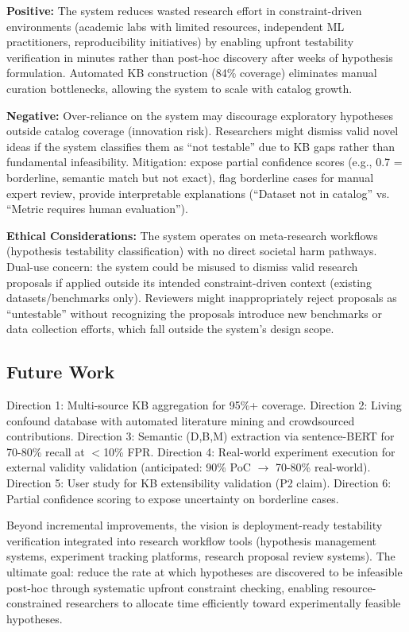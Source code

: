\textbf{Positive:} The system reduces wasted research effort in constraint-driven environments (academic labs with limited resources, independent ML practitioners, reproducibility initiatives) by enabling upfront testability verification in minutes rather than post-hoc discovery after weeks of hypothesis formulation. Automated KB construction (84\% coverage) eliminates manual curation bottlenecks, allowing the system to scale with catalog growth.

\textbf{Negative:} Over-reliance on the system may discourage exploratory hypotheses outside catalog coverage (innovation risk). Researchers might dismiss valid novel ideas if the system classifies them as ``not testable'' due to KB gaps rather than fundamental infeasibility. Mitigation: expose partial confidence scores (e.g., 0.7 = borderline, semantic match but not exact), flag borderline cases for manual expert review, provide interpretable explanations (``Dataset not in catalog'' vs. ``Metric requires human evaluation'').

\textbf{Ethical Considerations:} The system operates on meta-research workflows (hypothesis testability classification) with no direct societal harm pathways. Dual-use concern: the system could be misused to dismiss valid research proposals if applied outside its intended constraint-driven context (existing datasets/benchmarks only). Reviewers might inappropriately reject proposals as ``untestable'' without recognizing the proposals introduce new benchmarks or data collection efforts, which fall outside the system's design scope.

\subsection{Future Work}

Direction 1: Multi-source KB aggregation for 95\%+ coverage. Direction 2: Living confound database with automated literature mining and crowdsourced contributions. Direction 3: Semantic (D,B,M) extraction via sentence-BERT for 70-80\% recall at $<$10\% FPR. Direction 4: Real-world experiment execution for external validity validation (anticipated: 90\% PoC $\rightarrow$ 70-80\% real-world). Direction 5: User study for KB extensibility validation (P2 claim). Direction 6: Partial confidence scoring to expose uncertainty on borderline cases.

Beyond incremental improvements, the vision is deployment-ready testability verification integrated into research workflow tools (hypothesis management systems, experiment tracking platforms, research proposal review systems). The ultimate goal: reduce the rate at which hypotheses are discovered to be infeasible post-hoc through systematic upfront constraint checking, enabling resource-constrained researchers to allocate time efficiently toward experimentally feasible hypotheses.
